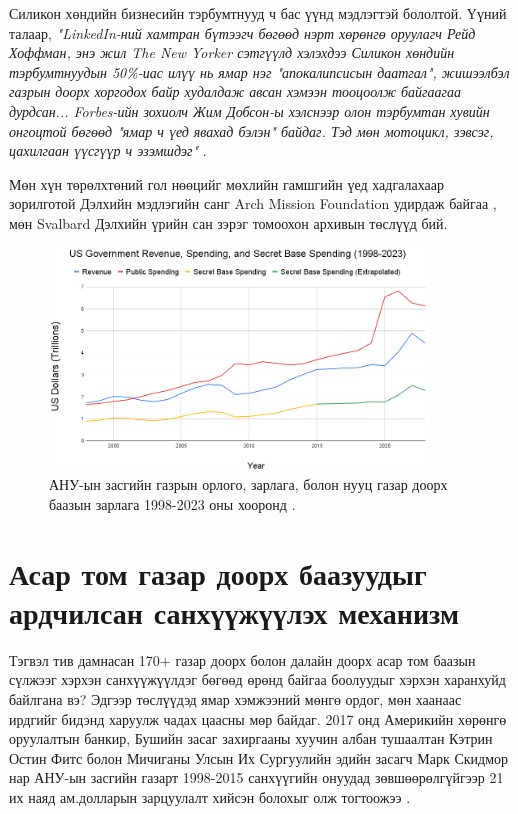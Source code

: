 \documentclass[10pt,twocolumn,letterpaper]{article}
\begin{document}
Силикон хөндийн бизнесийн тэрбумтнууд ч бас үүнд мэдлэгтэй бололтой. Үүний талаар, \textit{"LinkedIn-ний хамтран бүтээгч бөгөөд нэрт хөрөнгө оруулагч Рейд Хоффман, энэ жил The New Yorker сэтгүүлд хэлэхдээ Силикон хөндийн тэрбумтнуудын 50\%-иас илүү нь ямар нэг "апокалипсисын даатгал", жишээлбэл газрын доорх хоргодох байр худалдаж авсан хэмээн тооцоолж байгаагаа дурдсан... Forbes-ийн зохиолч Жим Добсон-ы хэлснээр олон тэрбумтан хувийн онгоцтой бөгөөд "ямар ч үед явахад бэлэн" байдаг. Тэд мөн мотоцикл, зэвсэг, цахилгаан үүсгүүр ч эзэмшдэг"} \cite{28}.

Мөн хүн төрөлхтөний гол нөөцийг мөхлийн гамшгийн үед хадгалахаар зорилготой Дэлхийн мэдлэгийн санг Arch Mission Foundation удирдаж байгаа \cite{29}, мөн Svalbard Дэлхийн үрийн сан \cite{30} зэрэг томоохон архивын төслүүд бий.
\begin{figure}[t]
\begin{center}
\includegraphics[width=0.9\textwidth]{govcrop2.png}
\end{center}
   \caption{АНУ-ын засгийн газрын орлого, зарлага, болон нууц газар доорх баазын зарлага 1998-2023 оны хооронд \cite{19}.}
   \label{fig:9}
\end{figure}
\section{Асар том газар доорх баазуудыг ардчилсан санхүүжүүлэх механизм}

Тэгвэл тив дамнасан 170+ газар доорх болон далайн доорх асар том баазын сүлжээг хэрхэн санхүүжүүлдэг бөгөөд өрөнд байгаа боолуудыг хэрхэн харанхуйд байлгана вэ? Эдгээр төслүүдэд ямар хэмжээний мөнгө ордог, мөн хаанаас ирдгийг бидэнд харуулж чадах цаасны мөр байдаг. 2017 онд Америкийн хөрөнгө оруулалтын банкир, Бушийн засаг захиргааны хуучин албан тушаалтан Кэтрин Остин Фитс болон Мичиганы Улсын Их Сургуулийн эдийн засагч Марк Скидмор нар АНУ-ын засгийн газарт 1998-2015 санхүүгийн онуудад зөвшөөрөлгүйгээр 21 их наяд ам.долларын зарцуулалт хийсэн болохыг олж тогтоожээ \cite{11,12,13}.
\end{document}

